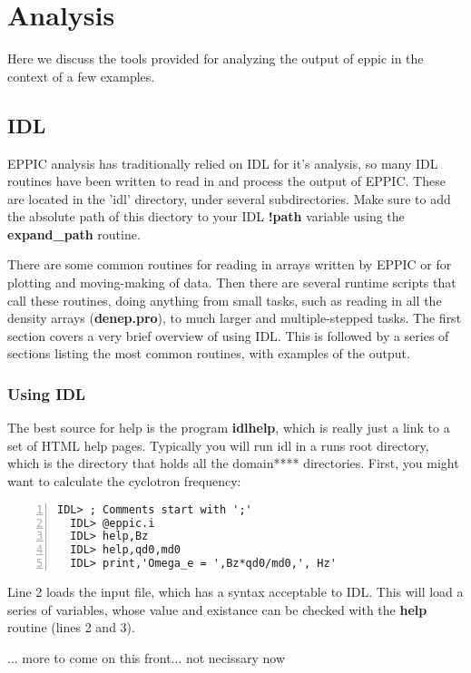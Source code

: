 
\chapter{Analysis}

Here we discuss the tools provided for analyzing the output of eppic
in the context of a few examples.  

\section{IDL}

EPPIC analysis has traditionally relied on IDL for it's analysis, so
many IDL routines have been written to read in and process the output
of EPPIC. These are located in the 'idl' directory, under several
subdirectories. Make sure to add the absolute path of this diectory to
your IDL \textbf{!path} variable using the \textbf{expand\_path}
routine. 

There are some common routines for reading in arrays written by EPPIC
or for plotting and moving-making of data. Then there are several
runtime scripts that call these routines, doing anything from small
tasks, such as reading in all the density arrays (\textbf{denep.pro}),
to much larger and multiple-stepped tasks. The first section covers a
very brief overview of using IDL. This is followed by a series of
sections listing the most common routines, with examples of the
output. 

\subsection{Using IDL}
The best source for help is the program \textbf{idlhelp}, which is
really just a link to a set of HTML help pages. Typically you will run
idl in a runs root directory, which is the directory that holds all
the domain**** directories. First, you might want to calculate the
cyclotron frequency:
\begin{lstlisting}[language=ITTIDL,numbers=left,stepnumber=2]
  IDL> ; Comments start with ';'
  IDL> @eppic.i
  IDL> help,Bz
  IDL> help,qd0,md0
  IDL> print,'Omega_e = ',Bz*qd0/md0,', Hz'
\end{lstlisting}
Line 2 loads the input file, which has a syntax acceptable to
IDL. This will load a series of variables, whose value and existance
can be checked with the \textbf{help} routine (lines 2 and 3). 

... more to come on this front... not necissary now

